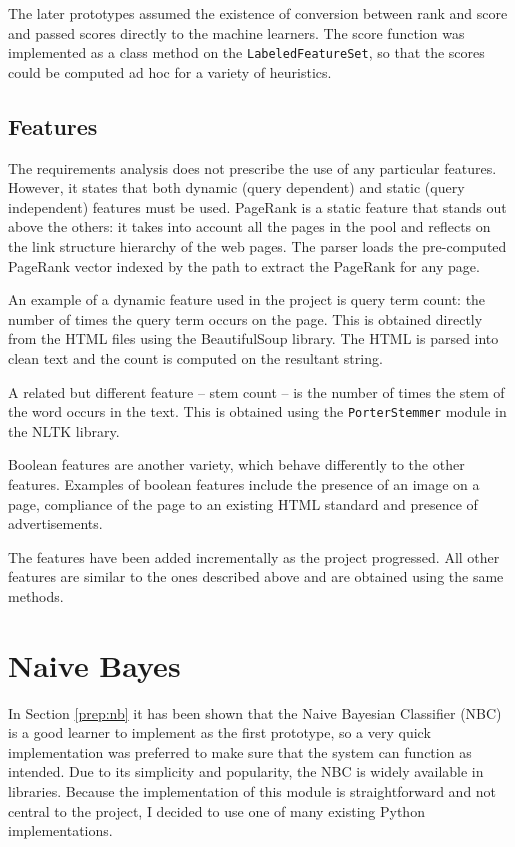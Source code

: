 \documentclass[12pt,a4paper,notitlepage,twoside]{scrbook}
\begin{document}
The later prototypes assumed the existence of conversion between rank and score and passed
scores directly to the machine learners. The score function was implemented as a class method on the
\texttt{LabeledFeatureSet}, so that the scores could be computed ad hoc for a variety of
heuristics.

\subsection{Features}


The requirements analysis does not prescribe the use of any particular
features. However, it states that both dynamic (query dependent) and
static (query independent) features must be used. PageRank is a static feature
that stands out above the others: it takes into account all the pages
in the pool and reflects on the link structure hierarchy of the web pages. 
The parser loads the pre-computed PageRank vector indexed by the path to
extract the PageRank for any page.

An example of a dynamic feature used in the project is query term count: the
number of times the query term occurs on the page. This is obtained directly
from the HTML files using the BeautifulSoup library.
The HTML is parsed into clean text and the count is
computed on the resultant string.

A related but different feature -- stem count -- is the number of times the
stem of the word occurs in the text. This is obtained using the \texttt{PorterStemmer}
module in the NLTK library.

Boolean features are another variety, which  behave differently to the other
features. Examples of boolean features include the presence of an image on a page, compliance
of the page to an existing HTML standard and presence of advertisements.

The features have been added incrementally as the project progressed. All other
features are similar to the ones described above and are obtained using the
same methods. 

\section{Naive Bayes}
In Section \ref{prep:nb} it has been shown that the Naive Bayesian Classifier (NBC) is a good learner
to implement as the first prototype, so a very quick implementation was
preferred to make sure that the system can function as intended. Due to
its simplicity and popularity, the NBC is widely available in 
libraries. Because the implementation of this module is straightforward and not
central to the project, I decided to use one of many existing Python
implementations. 
\end{document}
